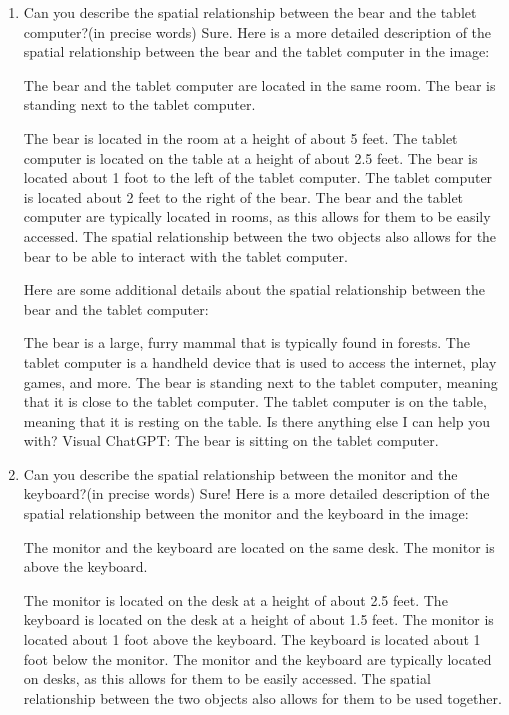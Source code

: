 \begin{enumerate}
    \item Can you describe the spatial relationship between the bear and the tablet computer?(in precise words)
    \subitem 
    Sure. Here is a more detailed description of the spatial relationship between the bear and the tablet computer in the image:
    
    The bear and the tablet computer are located in the same room. The bear is standing next to the tablet computer.
    
    The bear is located in the room at a height of about 5 feet.
    The tablet computer is located on the table at a height of about 2.5 feet.
    The bear is located about 1 foot to the left of the tablet computer.
    The tablet computer is located about 2 feet to the right of the bear.
    The bear and the tablet computer are typically located in rooms, as this allows for them to be easily accessed. The spatial relationship between the two objects also allows for the bear to be able to interact with the tablet computer.
    
    Here are some additional details about the spatial relationship between the bear and the tablet computer:
    
    The bear is a large, furry mammal that is typically found in forests.
    The tablet computer is a handheld device that is used to access the internet, play games, and more.
    The bear is standing next to the tablet computer, meaning that it is close to the tablet computer.
    The tablet computer is on the table, meaning that it is resting on the table.
    Is there anything else I can help you with?
    \subitem Visual ChatGPT: The bear is sitting on the tablet computer.
    \item Can you describe the spatial relationship between the monitor and the keyboard?(in precise words)
    \subitem 
    Sure! Here is a more detailed description of the spatial relationship between the monitor and the keyboard in the image:
    
    The monitor and the keyboard are located on the same desk. The monitor is above the keyboard.
    
    The monitor is located on the desk at a height of about 2.5 feet.
    The keyboard is located on the desk at a height of about 1.5 feet.
    The monitor is located about 1 foot above the keyboard.
    The keyboard is located about 1 foot below the monitor.
    The monitor and the keyboard are typically located on desks, as this allows for them to be easily accessed. The spatial relationship between the two objects also allows for them to be used together.
    

\end{enumerate}
